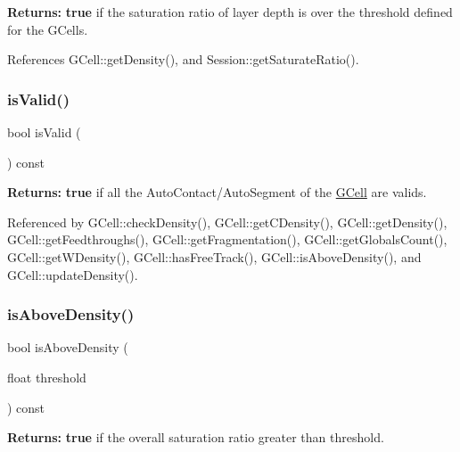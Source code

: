 {\bfseries Returns\+:} {\bfseries true} if the saturation ratio of layer {\ttfamily depth} is over the threshold defined for the G\+Cells. 

References G\+Cell\+::get\+Density(), and Session\+::get\+Saturate\+Ratio().

\mbox{\label{classKatabatic_1_1GCell_a5bc2a781be2586924afce4e4a4ea6697}} 
\subsubsection{\texorpdfstring{is\+Valid()}{isValid()}}
{\footnotesize\ttfamily bool is\+Valid (\begin{DoxyParamCaption}{ }\end{DoxyParamCaption}) const\hspace{0.3cm}{\ttfamily [inline]}}

{\bfseries Returns\+:} {\bfseries true} if all the Auto\+Contact/\+Auto\+Segment of the \mbox{\hyperlink{classKatabatic_1_1GCell}{G\+Cell}} are valids. 

Referenced by G\+Cell\+::check\+Density(), G\+Cell\+::get\+C\+Density(), G\+Cell\+::get\+Density(), G\+Cell\+::get\+Feedthroughs(), G\+Cell\+::get\+Fragmentation(), G\+Cell\+::get\+Globals\+Count(), G\+Cell\+::get\+W\+Density(), G\+Cell\+::has\+Free\+Track(), G\+Cell\+::is\+Above\+Density(), and G\+Cell\+::update\+Density().

\mbox{\label{classKatabatic_1_1GCell_a0e0a7b382b06e230051965bcb78ed21c}} 
\subsubsection{\texorpdfstring{is\+Above\+Density()}{isAboveDensity()}}
{\footnotesize\ttfamily bool is\+Above\+Density (\begin{DoxyParamCaption}\item[{float}]{threshold }\end{DoxyParamCaption}) const}

{\bfseries Returns\+:} {\bfseries true} if the overall saturation ratio greater than {\ttfamily threshold}. 

